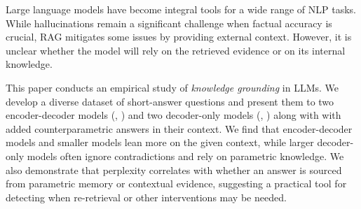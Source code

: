 Large language models have become integral tools for a wide range of NLP tasks.
While hallucinations remain a significant challenge when factual accuracy is crucial, RAG mitigates some issues by providing external context.
However, it is unclear whether the model will rely on the retrieved evidence or on its internal knowledge.

This paper conducts an empirical study of \emph{knowledge grounding} in LLMs.
We develop a diverse dataset of short-answer questions and present them to two encoder-decoder models (\smallflan{}, \bigflan{}) and two decoder-only models (\smallllama{}, \bigllama{}) along with with added counterparametric answers in their context.
We find that encoder-decoder models and smaller models lean more on the given context, while larger decoder-only models often ignore contradictions and rely on parametric knowledge. We also demonstrate that perplexity correlates with whether an answer is sourced from parametric memory or contextual evidence, suggesting a practical tool for detecting when re-retrieval or other interventions may be needed.

